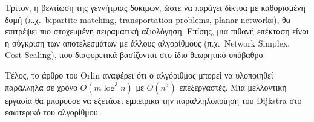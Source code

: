 \documentclass[11pt,a4paper,oneside]{report}
\begin{document}
Τρίτον, η βελτίωση της γεννήτριας δοκιμών, ώστε να παράγει δίκτυα με καθορισμένη δομή (π.χ.\ \textenglish{bipartite matching}, \textenglish{transportation problems}, \textenglish{planar networks}), θα επιτρέψει πιο στοχευμένη πειραματική αξιολόγηση. Επίσης, μια πιθανή επέκταση είναι η σύγκριση των αποτελεσμάτων με άλλους αλγορίθμους (π.χ.\ \textenglish{Network Simplex}, \textenglish{Cost-Scaling}), που διαφορετικά βασίζονται στο ίδιο θεωρητικό υπόβαθρο.

Τέλος, το άρθρο του \textenglish{Orlin} αναφέρει ότι ο αλγόριθμος μπορεί να υλοποιηθεί παράλληλα σε χρόνο $O(m \log^3 n)$ με $O(n^3)$ επεξεργαστές. Μια μελλοντική εργασία θα μπορούσε να εξετάσει εμπειρικά την παραλληλοποίηση του \textenglish{Dijkstra} στο εσωτερικό του αλγορίθμου.

\end{document}

